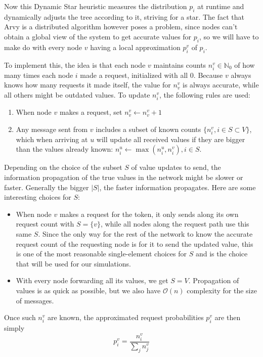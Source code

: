 \documentclass[a4paper, oneside]{discothesis}
\begin{document}
Now this Dynamic Star heuristic measures the distribution $p_i$ at runtime and dynamically adjusts the tree according to it, striving for a star. The fact that Arvy is a distributed algorithm however poses a problem, since nodes can't obtain a global view of the system to get accurate values for $p_i$, so we will have to make do with every node $v$ having a local approximation $p_i^v$ of $p_i$.

To implement this, the idea is that each node $v$ maintains counts $n_i^v\in\mathbb{N}_0$ of how many times each node $i$ made a request, initialized with all $0$. Because $v$ always knows how many requests it made itself, the value for $n_v^v$ is always accurate, while all others might be outdated values. To update $n_i^v$, the following rules are used:
\begin{enumerate}
\item When node $v$ makes a request, set $n_v^v\gets n_v^v+1$
\label{rule1}
\item Any message sent from $v$ includes a subset of known counts $\{n_i^v,i\in S\subset V\}$, which when arriving at $u$ will update all received values if they are bigger than the values already known: $n_i^u\gets \max(n_i^u,n_i^v),i\in S$.
\end{enumerate}

Depending on the choice of the subset $S$ of value updates to send, the information propagation of the true values in the network might be slower or faster. Generally the bigger $|S|$, the faster information propagates. Here are some interesting choices for $S$:
\begin{itemize}
\item When node $v$ makes a request for the token, it only sends along its own request count with $S=\{v\}$, while all nodes along the request path use this same $S$. Since the only way for the rest of the network to know the accurate request count of the requesting node is for it to send the updated value, this is one of the most reasonable single-element choices for $S$ and is the choice that will be used for our simulations.
\item With every node forwarding all its values, we get $S=V$. Propagation of values is as quick as possible, but we also have $\mathcal{O}(n)$ complexity for the size of messages.
\end{itemize}

Once such $n_i^v$ are known, the approximated request probabilities $p_i^v$ are then simply
\begin{equation}
p_i^v=\frac{n_i^v}{\sum_jn_j^v}
\end{equation}
\end{document}
